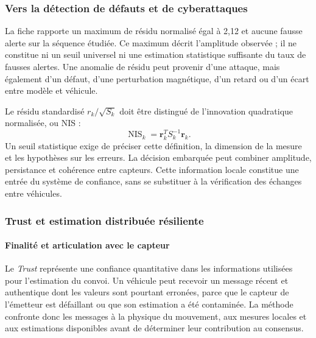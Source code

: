 \subsubsection{Vers la détection de défauts et de cyberattaques}

La fiche rapporte un maximum de résidu normalisé égal à 2,12 et aucune fausse alerte sur la séquence étudiée. Ce maximum décrit l'amplitude observée ; il ne constitue ni un seuil universel ni une estimation statistique suffisante du taux de fausses alertes. Une anomalie de résidu peut provenir d'une attaque, mais également d'un défaut, d'une perturbation magnétique, d'un retard ou d'un écart entre modèle et véhicule.

Le résidu standardisé $r_k/\sqrt{S_k}$ doit être distingué de l'innovation quadratique normalisée, ou NIS :
\begin{equation}
\operatorname{NIS}_k=\boldsymbol{r}_k^T S_k^{-1}\boldsymbol{r}_k.
\end{equation}
Un seuil statistique exige de préciser cette définition, la dimension de la mesure et les hypothèses sur les erreurs. La décision embarquée peut combiner amplitude, persistance et cohérence entre capteurs. Cette information locale constitue une entrée du système de confiance, sans se substituer à la vérification des échanges entre véhicules.

\FloatBarrier

\subsubsection{Trust et estimation distribuée résiliente}
\label{sec:trust}

\paragraph{Finalité et articulation avec le capteur}
Le \emph{Trust} représente une confiance quantitative dans les informations utilisées pour l'estimation du convoi. Un véhicule peut recevoir un message récent et authentique dont les valeurs sont pourtant erronées, parce que le capteur de l'émetteur est défaillant ou que son estimation a été contaminée. La méthode confronte donc les messages à la physique du mouvement, aux mesures locales et aux estimations disponibles avant de déterminer leur contribution au consensus.

